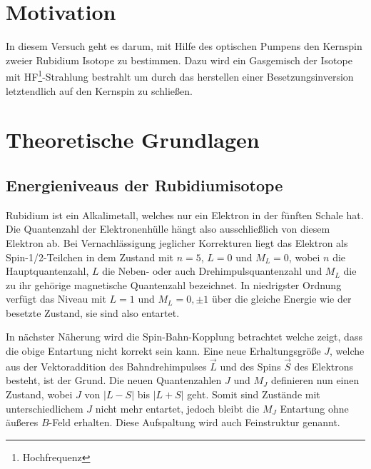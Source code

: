 \section{Motivation}
\label{sec:motivation}

In diesem Versuch geht es darum, mit Hilfe des optischen Pumpens den
Kernspin zweier Rubidium Isotope zu bestimmen. Dazu wird ein Gasgemisch
der Isotope mit HF\footnote{Hochfrequenz}-Strahlung bestrahlt um durch
das herstellen einer Besetzungsinversion letztendlich auf den Kernspin
zu schließen.

\section{Theoretische Grundlagen}
\label{sec:theorie}

\subsection{Energieniveaus der Rubidiumisotope}

Rubidium ist ein Alkalimetall, welches nur ein Elektron in der fünften Schale hat.
Die Quantenzahl der Elektronenhülle hängt also ausschließlich von diesem Elektron ab.
Bei Vernachlässigung jeglicher Korrekturen liegt das Elektron als Spin-1/2-Teilchen
in dem Zustand mit $n=5$, $L=0$ und $M_L=0$, wobei $n$ die Hauptquantenzahl,
$L$ die Neben- oder auch Drehimpulsquantenzahl und $M_L$ die zu ihr
gehörige magnetische Quantenzahl bezeichnet.
In niedrigster Ordnung verfügt das Niveau mit $L=1$ und $M_L=0,\pm1$
über die gleiche Energie wie der besetzte Zustand, sie sind also entartet.

In nächster Näherung wird die Spin-Bahn-Kopplung betrachtet welche zeigt,
dass die obige Entartung nicht korrekt sein kann.
Eine neue Erhaltungsgröße $J$, welche aus der Vektoraddition
des Bahndrehimpulses $\vec{L}$ und des Spins $\vec{S}$ des Elektrons besteht, ist der Grund.
Die neuen Quantenzahlen $J$ und $M_J$ definieren nun einen Zustand,
wobei $J$ von $\lvert L - S \rvert$ bis $\lvert L + S \rvert$ geht.
Somit sind Zustände mit unterschiedlichem $J$ nicht mehr entartet,
jedoch bleibt die $M_J$ Entartung ohne äußeres $B$-Feld erhalten.
Diese Aufspaltung wird auch Feinstruktur genannt.

